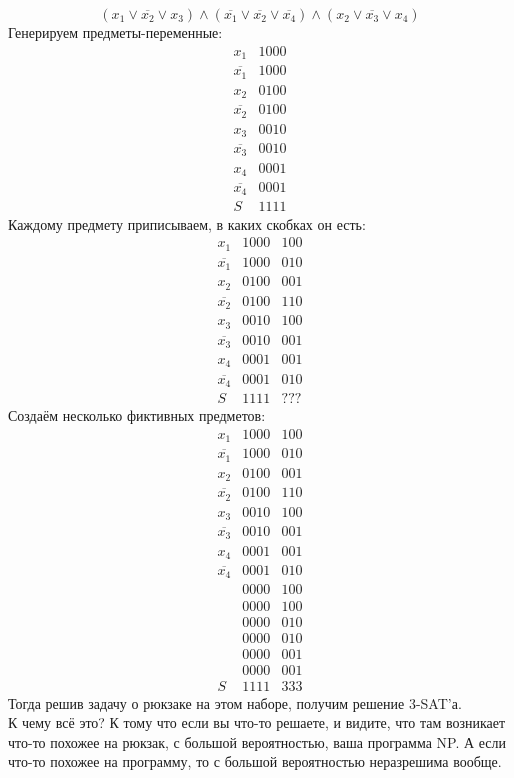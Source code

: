 \documentclass{article}
\begin{document}
    $$
    (x_1\lor\overline{x_2}\lor x_3)\land(\overline{x_1}\lor\overline{x_2}\lor\overline{x_4})\land(x_2\lor\overline{x_3}\lor x_4)
    $$
    Генерируем предметы-переменные:
    $$
    \begin{matrix}
        x_1 & 1000\\
        \overline{x_1} & 1000\\
        x_2 & 0100\\
        \overline{x_2} & 0100\\
        x_3 & 0010\\
        \overline{x_3} & 0010\\
        x_4 & 0001\\
        \overline{x_4} & 0001\\
        S & 1111
    \end{matrix}
    $$
    Каждому предмету приписываем, в каких скобках он есть:
    $$
    \begin{matrix}
        x_1 & 1000 & 100\\
        \overline{x_1} & 1000 & 010\\
        x_2 & 0100 & 001\\
        \overline{x_2} & 0100 & 110\\
        x_3 & 0010 & 100\\
        \overline{x_3} & 0010 & 001\\
        x_4 & 0001 & 001\\
        \overline{x_4} & 0001 & 010\\
        S & 1111 & ???
    \end{matrix}
    $$
    Создаём несколько фиктивных предметов:
    $$
    \begin{matrix}
        x_1 & 1000 & 100\\
        \overline{x_1} & 1000 & 010\\
        x_2 & 0100 & 001\\
        \overline{x_2} & 0100 & 110\\
        x_3 & 0010 & 100\\
        \overline{x_3} & 0010 & 001\\
        x_4 & 0001 & 001\\
        \overline{x_4} & 0001 & 010\\
        & 0000 & 100\\
        & 0000 & 100\\
        & 0000 & 010\\
        & 0000 & 010\\
        & 0000 & 001\\
        & 0000 & 001\\
        S & 1111 & 333
    \end{matrix}
    $$
    Тогда решив задачу о рюкзаке на этом наборе, получим решение 3-SAT'а.\\
    К чему всё это? К тому что если вы что-то решаете, и видите, что там возникает что-то похожее на рюкзак, с большой вероятностью, ваша программа NP. А если что-то похожее на программу, то с большой вероятностью неразрешима вообще.
\end{document}
